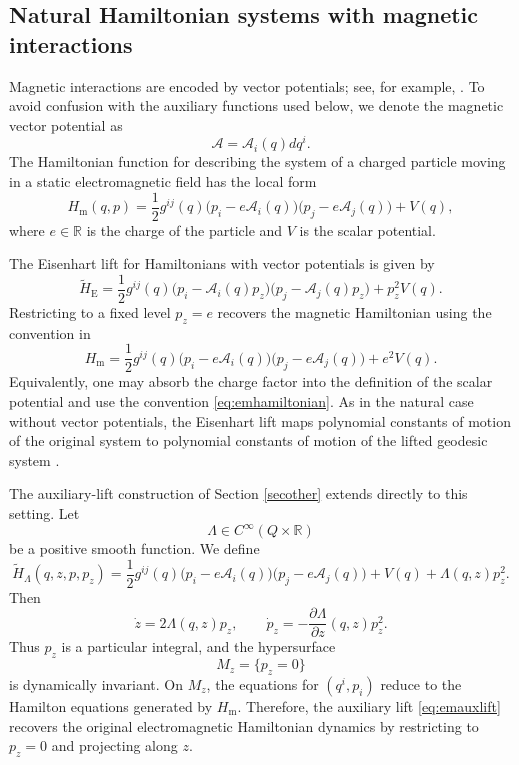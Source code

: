 \documentclass[10pt,a4paper]{article}
\begin{document}
\subsection{Natural Hamiltonian systems with magnetic interactions}

Magnetic interactions are encoded by vector potentials; see, for example, \cite{hoque2023family,marchesiello2015three}. To avoid confusion with the auxiliary functions used below, we denote the magnetic vector potential as
\[
\mathcal A=\mathcal A_i(q)dq^i .
\]
The Hamiltonian function for describing the system of a charged particle moving in a static electromagnetic field has the local form
\begin{equation}
\label{eq:emhamiltonian}
H_{\mathrm{m}}(q,p)
=
\frac{1}{2}g^{ij}(q)
\bigl(p_i-e\mathcal A_i(q)\bigr)
\bigl(p_j-e\mathcal A_j(q)\bigr)
+V(q),
\end{equation}
where \(e\in\mathbb R\) is the charge of the particle and \(V\) is the scalar potential.

The Eisenhart lift for Hamiltonians with vector potentials is given by \cite{cariglia2015eisenhart}
\begin{equation*}
\label{eq:emeisenhart}
\widetilde H_{\mathrm{E}}
=
\frac{1}{2}g^{ij}(q)
\bigl(p_i-\mathcal A_i(q)p_z\bigr)
\bigl(p_j-\mathcal A_j(q)p_z\bigr)
+
p_z^2V(q).
\end{equation*}
Restricting to a fixed level \(p_z=e\) recovers the magnetic Hamiltonian using the convention in \cite{cariglia2015eisenhart}
\[
H_{\mathrm{m}}
=
\frac{1}{2}g^{ij}(q)
\bigl(p_i-e\mathcal A_i(q)\bigr)
\bigl(p_j-e\mathcal A_j(q)\bigr)
+
e^2V(q).
\]
Equivalently, one may absorb the charge factor into the definition of the scalar potential and use the convention \eqref{eq:emhamiltonian}. As in the natural case without vector potentials, the Eisenhart lift maps polynomial constants of motion of the original system to polynomial constants of motion of the lifted geodesic system \cite{cariglia2014hidden}.

The auxiliary-lift construction of Section \ref{secother} extends directly to this setting. Let
\[
\Lambda\in C^\infty(Q\times\mathbb R)
\]
be a positive smooth function. We define
\begin{equation}
\label{eq:emauxlift}
\widetilde H_{\Lambda}(q,z,p,p_z)
=
\frac{1}{2}g^{ij}(q)
\bigl(p_i-e\mathcal A_i(q)\bigr)
\bigl(p_j-e\mathcal A_j(q)\bigr)
+
V(q)
+
\Lambda(q,z)p_z^2 .
\end{equation}
Then
\[
\dot z=2\Lambda(q,z)p_z,
\qquad
\dot p_z=-\frac{\partial \Lambda}{\partial z}(q,z)p_z^2.
\]
Thus \(p_z\) is a particular integral, and the hypersurface
\[
M_z=\{p_z=0\}
\]
is dynamically invariant. On \(M_z\), the equations for \((q^i,p_i)\) reduce to the Hamilton equations generated by \(H_{\mathrm{m}}\). Therefore, the auxiliary lift \eqref{eq:emauxlift} recovers the original electromagnetic Hamiltonian dynamics by restricting to \(p_z=0\) and projecting along \(z\).
\end{document}
